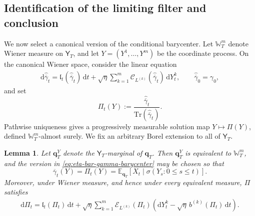\documentclass[10pt,a4paper,reqno]{amsart}
\numberwithin{equation}{section}
\theoremstyle{plain}
\newtheorem{lemma}[theorem]{Lemma}
\theoremstyle{definition}
\theoremstyle{remark}
\renewcommand{\d}{\mathrm d}
\newcommand{\Tr}{\mathrm{Tr}}
\newcommand{\E}{\mathbb E}
\newcommand{\cC}{\mathcal C}
\newcommand{\cE}{\mathcal E}
\newcommand{\1}{\mathbf 1}
\begin{document}
\subsection{Identification of the limiting filter and conclusion}
\label{subsec:eta-return-to-target}

We now select a canonical version of the conditional barycenter.  Let
\(\mathbb W_T^m\) denote Wiener measure on \(\mathsf Y_T\), and let
\(Y=(Y^1,\ldots,Y^m)\) be the coordinate process.  On the canonical Wiener
space, consider the linear equation
\begin{equation}
\begin{aligned}
  \d\widehat{\overline\gamma}_t
  =
  \mathfrak l_t(\widehat{\overline\gamma}_t)\,\d t
  +
  \sqrt{\eta}
  \sum_{k=1}^m
  \cC_{L^{(k)}}(\widehat{\overline\gamma}_t)\,\d Y_t^k,\qquad 
  \widehat{\overline\gamma}_0
  =
  \gamma_0,
\end{aligned}
  \label{eq:eta-local-linear-SDE}
\end{equation}
and set
\begin{equation}
  \Pi_t(Y)
  :=
  \frac{
    \widehat{\overline\gamma}_t
  }{
    \Tr(\widehat{\overline\gamma}_t)
  }.
  \label{eq:eta-Pi-def}
\end{equation}
Pathwise uniqueness gives a progressively measurable solution map
\(Y\longmapsto\Pi(Y)\), defined \(\mathbb W_T^m\)-almost surely.  We fix an
arbitrary Borel extension to all of \(\mathsf Y_T\).



\begin{lemma}
\label{lem:eta-barycenter-identification}
Let \(\mathbf q_T^Y\) denote the \(\mathsf Y_T\)-marginal of
\(\mathbf q_T\). Then \(\mathbf q_T^Y\) is equivalent to
\(\mathbb W_T^m\), and the version in
\eqref{eq:eta-bar-gamma-barycenter} may be chosen so that
\begin{equation}
  \overline\gamma_t(Y)
  =
  \Pi_t(Y)
  =
  \E_{\mathbf q_T}
  \left[
    X_t\mid\sigma(Y_s:0\le s\le t)
  \right].
  \label{eq:eta-barycenter-identification}
\end{equation}
Moreover, under Wiener measure, and hence under every equivalent measure,
\(\Pi\) satisfies
\begin{equation}
\begin{aligned}
  \d\Pi_t
  =
  \mathfrak l_t(\Pi_t)\,\d t+
  \sqrt{\eta}
  \sum_{k=1}^m
  \cE_{L^{(k)}}(\Pi_t)
  \left(
    \d Y_t^k
    -
    \sqrt{\eta}\,b^{(k)}(\Pi_t)\,\d t
  \right).
\end{aligned}
  \label{eq:eta-local-observation-SDE}
\end{equation}
\end{lemma}
\end{document}
